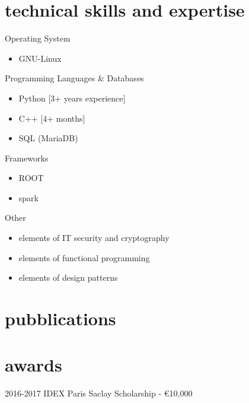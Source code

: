 \documentclass[]{cv-style}     %
\begin{document}
\section{technical skills and expertise}
\par\vspace{.5\parskip}%
 {\color{gray}\headingfont Operating System}
 \begin{itemize}
  \item GNU-Linux
 \end{itemize}
 {\color{gray}\headingfont Programming Languages \& Databases}
 \begin{itemize}
  \item Python [3+ years experience]
  \item C++ [4+ months]
  \item SQL (MariaDB)
 \end{itemize}
 {\color{gray}\headingfont Frameworks}
 \begin{itemize}
  \item ROOT
  \item spark
 \end{itemize}
 {\color{gray}\headingfont Other}
 {%
 \begin{itemize}
  \item elements of IT security and cryptography
  \item elements of functional programming
  \item elements of design patterns
 \end{itemize}
 }
 \par\vspace{.5\parskip}
 
\pagebreak
\section{pubblications}
\section{awards}
\par\vspace{.5\parskip}%
\begin{entrylist}
\entry
{2016-2017}
{IDEX Paris Saclay Scholarship - \euro 10,000}
{}
{}
\end{entrylist}
\end{document}
